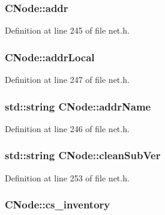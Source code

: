 \subsubsection[{addr}]{ C\+Node\+::addr}\label{class_c_node_a3993ecb1de2a2135a3cf0904346a6f88}


Definition at line 245 of file net.\+h.

\hypertarget{class_c_node_a1b6517682efa0709f44780a95384c4ec}{}
\subsubsection[{addr\+Local}]{ C\+Node\+::addr\+Local}\label{class_c_node_a1b6517682efa0709f44780a95384c4ec}


Definition at line 247 of file net.\+h.

\hypertarget{class_c_node_a3155cd313d85ec3ff691f8259a5f5345}{}
\subsubsection[{addr\+Name}]{\setlength{\rightskip}{0pt plus 5cm}std\+::string C\+Node\+::addr\+Name}\label{class_c_node_a3155cd313d85ec3ff691f8259a5f5345}


Definition at line 246 of file net.\+h.

\hypertarget{class_c_node_a05f0401427c5ffebd1ca404848e83ff7}{}
\subsubsection[{clean\+Sub\+Ver}]{\setlength{\rightskip}{0pt plus 5cm}std\+::string C\+Node\+::clean\+Sub\+Ver}\label{class_c_node_a05f0401427c5ffebd1ca404848e83ff7}


Definition at line 253 of file net.\+h.

\hypertarget{class_c_node_a1e8b0784cc82f33edc2dc4e2834d1ff0}{}
\subsubsection[{cs\+\_\+inventory}]{ C\+Node\+::cs\+\_\+inventory}\label{class_c_node_a1e8b0784cc82f33edc2dc4e2834d1ff0}


